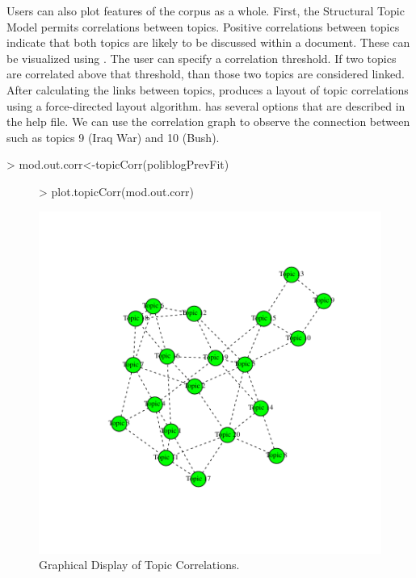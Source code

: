 \documentclass[nojss]{jss}
\begin{document}
Users can also plot features of the corpus as a whole. First, the Structural Topic Model permits correlations between topics. Positive correlations between topics indicate that both topics are likely to be discussed within a document. These can be visualized using . The user can specify a correlation threshold.  If two topics are correlated above that threshold, than those two topics are considered linked.  After calculating the links between topics,  produces a layout of topic correlations using a force-directed layout algorithm.  has several options that are described in the help file. We can use the correlation graph to observe the connection between such as topics 9 (Iraq War) and 10 (Bush).

\begin{Schunk}
\begin{Sinput}
> mod.out.corr<-topicCorr(poliblogPrevFit)
\end{Sinput}
\end{Schunk}

\begin{figure}[t!]
\begin{center}
\begin{Schunk}
\begin{Sinput}
> plot.topicCorr(mod.out.corr)
\end{Sinput}
\end{Schunk}
\includegraphics{stmVignette-023}
\caption{Graphical Display of Topic Correlations.}
\label{fig:correlations}
\end{center}
\end{figure}
\end{document}

